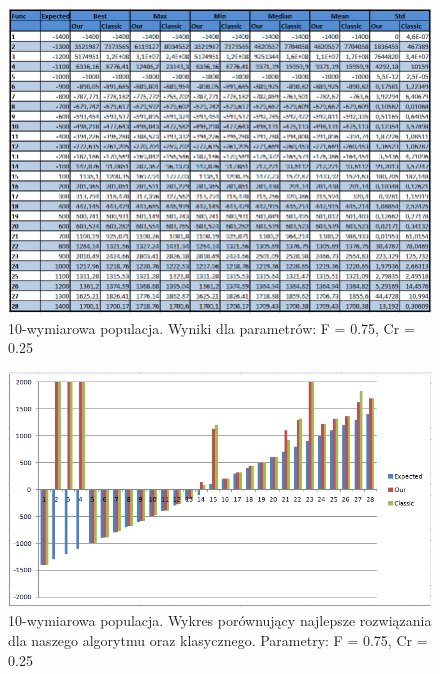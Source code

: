 \documentclass[a4paper]{article}
\begin{document}
\begin{figure}
\centering
\includegraphics[width=\textwidth]{F75Cr25L10tab.png}
\caption{10-wymiarowa populacja. Wyniki dla parametrów: F = 0.75, Cr = 0.25}
\end{figure}

\begin{figure}
\centering
\includegraphics[width=\textwidth]{F75Cr25L10chart.png}
\caption{10-wymiarowa populacja. Wykres porównujący najlepsze rozwiązania dla naszego algorytmu oraz klasycznego. Parametry: F = 0.75, Cr = 0.25}
\end{figure}
\end{document}
